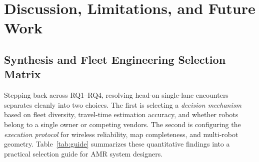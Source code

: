 \section{Discussion, Limitations, and Future Work}\label{sec:disc}


\subsection{Synthesis and Fleet Engineering Selection Matrix}
Stepping back across RQ1--RQ4, resolving head-on single-lane encounters separates cleanly into two choices. The first is selecting a \emph{decision mechanism} based on fleet diversity, travel-time estimation accuracy, and whether robots belong to a single owner or competing vendors. The second is configuring the \emph{execution protocol} for wireless reliability, map completeness, and multi-robot geometry. Table~\ref{tab:guide} summarizes these quantitative findings into a practical selection guide for AMR system designers.

